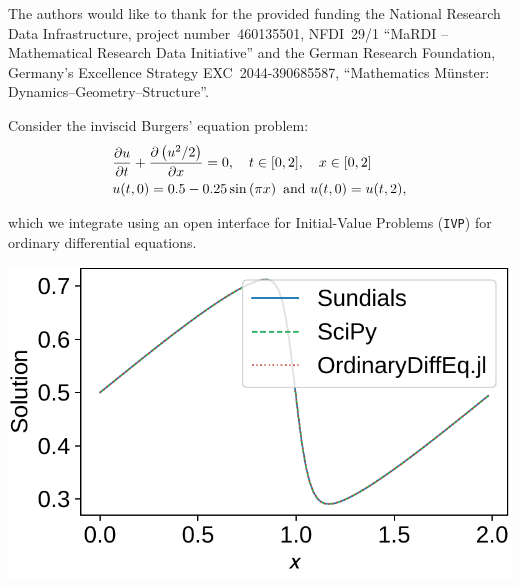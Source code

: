 \documentclass[a0paper, twocolumn, csc, english, final]{mpi2015_poster}
\begin{document}
\begin{poster}
\begin{pcolumn}
    \begin{pbox}
      \large
      The authors would like to thank for the provided funding
      the National Research Data Infrastructure,
      project number~460135501, NFDI~29/1 “MaRDI – Mathematical
      Research Data Initiative”
      and
      the German Research Foundation,
      Germany's Excellence Strategy EXC~2044-390685587,
      ``Mathematics Münster: Dynamics--Geometry--Structure''.
    \end{pbox}
  \end{pcolumn}\hfill
  \begin{pcolumn}
    \begin{pbox}
      \large
      Consider the inviscid Burgers' equation problem:
      \begin{align*}
         & \pdv{u}{t} + \pdv{\left( u^{2} / 2 \right)}{x} = 0,
        \quad t \in [0, 2], \quad x \in [0, 2]                         \\
         & u(t, 0) = 0.5 - 0.25 \sin \left( \pi x \right) \mbox{ and }
        u(t, 0) = u(t, 2),
      \end{align*}
      \begin{minipage}{\dimexpr0.58\columnwidth - 2\tabcolsep}
        which we integrate
        using an open interface
        for Initial-Value Problems (\texttt{IVP}) for ordinary differential
        equations.

      \end{minipage}\hfill%
      \begin{minipage}{\dimexpr0.42\columnwidth - 2\tabcolsep}
        \vspace{0.5em}
        \centerline{\includegraphics[scale=1]{ivp_c_burgers_eq}}
      \end{minipage}


\end{pbox}
\end{pcolumn}
\end{poster}
\end{document}
